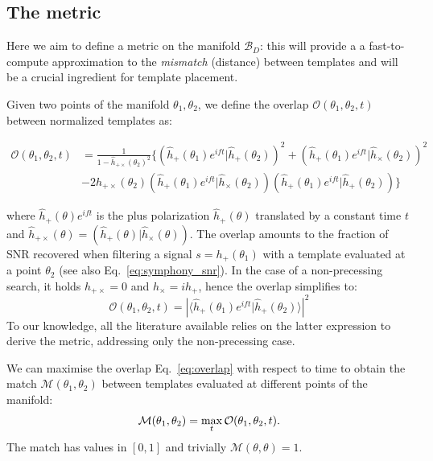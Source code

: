 \documentclass[twocolumn,showpacs,preprintnumbers,nofootinbib,prd,
superscriptaddress,10pt]{revtex4-2}
\newcommand{\scalar}[2]{\langle #1|#2 \rangle}
\newcommand{\rescalar}[2]{( #1 |#2 )}
\newcommand{\rescalarwide}[2]{\left( #1 \lvert #2 \right)}
\begin{document}
\subsection{The metric} \label{sec:metric}

Here we aim to define a metric on the manifold $\mathcal{B}_D$: this will provide a a fast-to-compute approximation to the {\it mismatch} (distance) between templates and will be a crucial ingredient for template placement.

Given two points of the manifold $\theta_1,\theta_2$, we define the overlap $\mathcal{O}(\theta_1,\theta_2, t)$ between normalized templates as:
\begin{widetext}
	\begin{align}\label{eq:overlap}
		\mathcal{O}(\theta_1,\theta_2, t) &= \frac{1}{1- \hat{h}_{+\times}(\theta_2)^2} 
		\biggl\{ \rescalarwide{\hat{h}_+(\theta_1)e^{i ft}}{\hat{h}_+(\theta_2)}^2 + \rescalarwide{\hat{h}_+(\theta_1)e^{i ft}}{\hat{h}_\times(\theta_2)}^2 \nonumber \\
		& -2h_{+\times}(\theta_2)\rescalarwide{\hat{h}_+(\theta_1)e^{i ft}}{\hat{h}_\times(\theta_2)}\rescalarwide{\hat{h}_+(\theta_1)e^{i ft}}{\hat{h}_+(\theta_2)} \biggl\}
	\end{align}
\end{widetext}
where $\hat{h}_+(\theta)e^{i ft}$ is the plus polarization $\hat{h}_+(\theta)$ translated by a constant time $t$ and $\hat{h}_{+\times}(\theta) = \rescalar{\hat{h}_+(\theta)}{\hat{h}_\times(\theta)}$.
The overlap amounts to the fraction of SNR recovered when filtering a signal $s=h_+(\theta_1)$ with a template evaluated at a point $\theta_2$ (see also Eq.~\eqref{eq:symphony_snr}).
In the case of a non-precessing search, it holds $h_{+\times} = 0$ and $h_\times = i h_+$, hence the overlap simplifies to:
\begin{equation}\label{eq:overlap_NP}
\mathcal{O}(\theta_1,\theta_2, t) = \left|\scalar{\hat{h}_+(\theta_1)e^{i ft}}{\hat{h}_+(\theta_2)} \right|^2
\end{equation}
To our knowledge, all the literature available \cite{owen_metric, Messenger:2008ta, Prix:2007ks, Brown:2012qf, Roy:2017oul, Coogan:2022qxs, Hanna:2022zpk} relies on the latter expression to derive the metric, addressing only the non-precessing case.

We can maximise the overlap Eq.~\eqref{eq:overlap} with respect to time to obtain the match $\mathcal{M}(\theta_1,\theta_2)$ between templates evaluated at different points of the manifold:
\begin{equation}\label{eq:match}
	\mathcal{M}(\theta_1,\theta_2) = \max_t \mathcal{O}(\theta_1,\theta_2, t). \\
\end{equation}
%
The match has values in $[0,1]$ and trivially $\mathcal{M}(\theta,\theta) = 1$.
\end{document}
